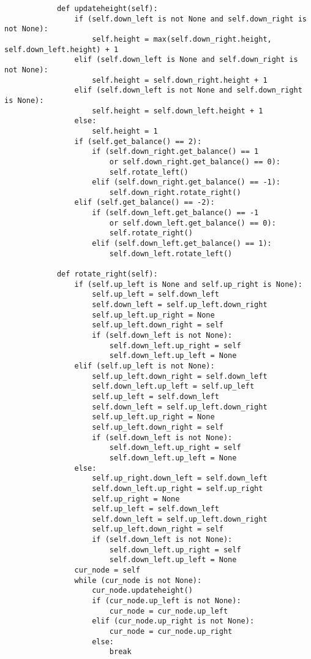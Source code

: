 \begin{lstlisting}
            def updateheight(self):
                if (self.down_left is not None and self.down_right is not None):
                    self.height = max(self.down_right.height, self.down_left.height) + 1
                elif (self.down_left is None and self.down_right is not None):
                    self.height = self.down_right.height + 1
                elif (self.down_left is not None and self.down_right is None):
                    self.height = self.down_left.height + 1
                else:
                    self.height = 1
                if (self.get_balance() == 2):
                    if (self.down_right.get_balance() == 1
                        or self.down_right.get_balance() == 0):
                        self.rotate_left()
                    elif (self.down_right.get_balance() == -1):
                        self.down_right.rotate_right()
                elif (self.get_balance() == -2):
                    if (self.down_left.get_balance() == -1
                        or self.down_left.get_balance() == 0):
                        self.rotate_right()
                    elif (self.down_left.get_balance() == 1):
                        self.down_left.rotate_left()
                    
            def rotate_right(self):
                if (self.up_left is None and self.up_right is None):
                    self.up_left = self.down_left
                    self.down_left = self.up_left.down_right
                    self.up_left.up_right = None
                    self.up_left.down_right = self
                    if (self.down_left is not None):
                        self.down_left.up_right = self
                        self.down_left.up_left = None
                elif (self.up_left is not None):
                    self.up_left.down_right = self.down_left
                    self.down_left.up_left = self.up_left
                    self.up_left = self.down_left
                    self.down_left = self.up_left.down_right
                    self.up_left.up_right = None
                    self.up_left.down_right = self
                    if (self.down_left is not None):
                        self.down_left.up_right = self
                        self.down_left.up_left = None
                else:
                    self.up_right.down_left = self.down_left
                    self.down_left.up_right = self.up_right
                    self.up_right = None
                    self.up_left = self.down_left
                    self.down_left = self.up_left.down_right
                    self.up_left.down_right = self
                    if (self.down_left is not None):
                        self.down_left.up_right = self
                        self.down_left.up_left = None
                cur_node = self
                while (cur_node is not None):
                    cur_node.updateheight()
                    if (cur_node.up_left is not None):
                        cur_node = cur_node.up_left
                    elif (cur_node.up_right is not None):
                        cur_node = cur_node.up_right
                    else:
                        break
            

\end{lstlisting}
